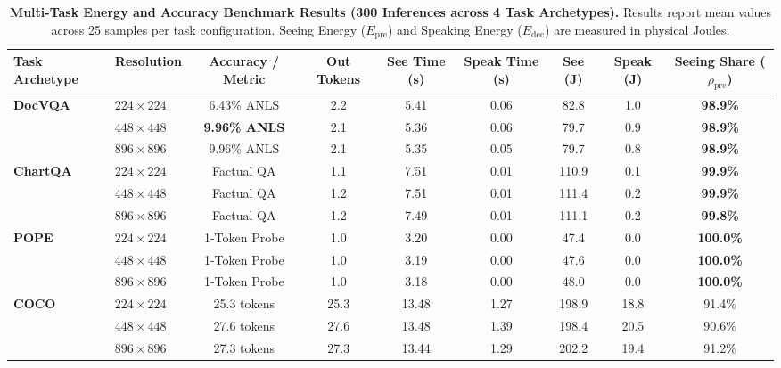 \begin{table}[t]
\centering
\small
\caption{\textbf{Multi-Task Energy and Accuracy Benchmark Results (300 Inferences across 4 Task Archetypes).} Results report mean values across 25 samples per task configuration. Seeing Energy ($E_{\text{pre}}$) and Speaking Energy ($E_{\text{dec}}$) are measured in physical Joules.}
\label{tab:main_results}
\begin{tabular}{llccccccc}
\toprule
\textbf{Task Archetype} & \textbf{Resolution} & \textbf{Accuracy / Metric} & \textbf{Out Tokens} & \textbf{See Time (s)} & \textbf{Speak Time (s)} & \textbf{See (J)} & \textbf{Speak (J)} & \textbf{Seeing Share ($\rho_{\text{pre}}$)} \\
\midrule
\multirow{3}{*}{\textbf{DocVQA}} & $224 \times 224$ & 6.43\% ANLS & 2.2 & 5.41 & 0.06 & 82.8 & 1.0 & \textbf{98.9\%} \\
 & $448 \times 448$ & \textbf{9.96\% ANLS} & 2.1 & 5.36 & 0.06 & 79.7 & 0.9 & \textbf{98.9\%} \\
 & $896 \times 896$ & 9.96\% ANLS & 2.1 & 5.35 & 0.05 & 79.7 & 0.8 & \textbf{98.9\%} \\
\midrule
\multirow{3}{*}{\textbf{ChartQA}} & $224 \times 224$ & Factual QA & 1.1 & 7.51 & 0.01 & 110.9 & 0.1 & \textbf{99.9\%} \\
 & $448 \times 448$ & Factual QA & 1.2 & 7.51 & 0.01 & 111.4 & 0.2 & \textbf{99.9\%} \\
 & $896 \times 896$ & Factual QA & 1.2 & 7.49 & 0.01 & 111.1 & 0.2 & \textbf{99.8\%} \\
\midrule
\multirow{3}{*}{\textbf{POPE}} & $224 \times 224$ & 1-Token Probe & 1.0 & 3.20 & 0.00 & 47.4 & 0.0 & \textbf{100.0\%} \\
 & $448 \times 448$ & 1-Token Probe & 1.0 & 3.19 & 0.00 & 47.6 & 0.0 & \textbf{100.0\%} \\
 & $896 \times 896$ & 1-Token Probe & 1.0 & 3.18 & 0.00 & 48.0 & 0.0 & \textbf{100.0\%} \\
\midrule
\multirow{3}{*}{\textbf{COCO}} & $224 \times 224$ & 25.3 tokens & 25.3 & 13.48 & 1.27 & 198.9 & 18.8 & 91.4\% \\
 & $448 \times 448$ & 27.6 tokens & 27.6 & 13.48 & 1.39 & 198.4 & 20.5 & 90.6\% \\
 & $896 \times 896$ & 27.3 tokens & 27.3 & 13.44 & 1.29 & 202.2 & 19.4 & 91.2\% \\
\bottomrule
\end{tabular}
\end{table}

